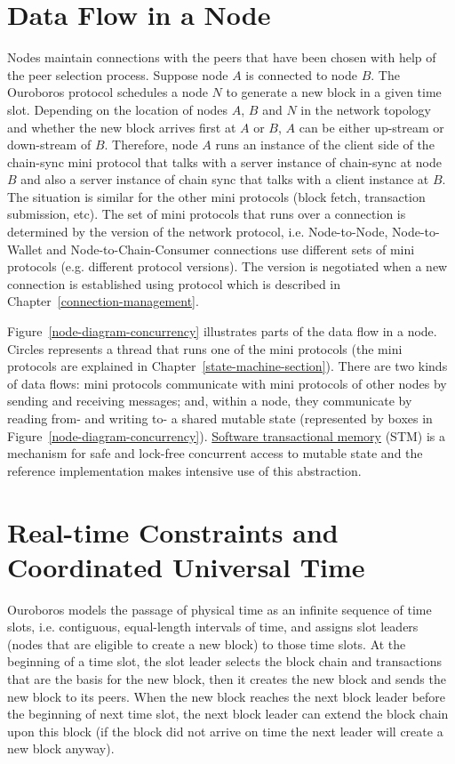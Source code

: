 \documentclass{report}
\newcommand{\hide}[1]{}
\newcommand{\hide}[1]{}
\theoremstyle{definition}{
  \newtheorem{lemma}{Lemma}[section] %
  \newtheorem{definition}[lemma]{Definition}
}
\theoremstyle{theorem}{
  \newtheorem{invariant}[lemma]{Invariant}
  \newtheorem{proofobligation}[lemma]{Proof Obligation}
}
\numberwithin{equation}{lemma}
\begin{document}
\section{Data Flow in a Node}
Nodes maintain connections with the peers that have been chosen
with help of the peer selection process.
Suppose node $A$ is connected to node $B$.
The Ouroboros protocol schedules a node $N$ to generate a new block in a given time slot.
Depending on the location of nodes $A$, $B$ and $N$ in the network topology and whether the new
block arrives first at $A$ or $B$, $A$ can be either up-stream or down-stream of $B$.
Therefore, node $A$ runs an instance of the client side of the chain-sync mini protocol
that talks with a server instance of chain-sync at node $B$ and also a server instance of chain sync
that talks with a client instance at $B$.
The situation is similar for the other mini protocols (block fetch, transaction submission, etc).
The set of mini protocols that runs over a connection is determined by the version of the network
protocol, i.e.  Node-to-Node, Node-to-Wallet and Node-to-Chain-Consumer
connections use different sets of mini protocols (e.g. different protocol
versions).  The version is negotiated when a new connection is established
using protocol which is described in Chapter~\ref{connection-management}.
\hide{Add description of this protocol in Chapter~\ref{connection-management}
and link it.}

Figure~\ref{node-diagram-concurrency} illustrates parts of the data flow in a node.
Circles represents a thread that runs one of the mini protocols (the mini protocols are explained in
Chapter~\ref{state-machine-section}).
There are two kinds of data flows:
mini protocols communicate with mini protocols of other nodes by sending and receiving messages;
and, within a node, they communicate by reading from- and writing to- a shared
mutable state (represented by boxes in Figure~\ref{node-diagram-concurrency}).
\href{https://en.wikipedia.org/wiki/Software_transactional_memory}{Software transactional memory}
(STM) is a mechanism for safe and lock-free concurrent
access to mutable state and the reference implementation makes intensive use of this abstraction.

\section{Real-time Constraints and Coordinated Universal Time}
Ouroboros models the passage of physical time as an infinite sequence of time slots,
i.e. contiguous, equal-length intervals of time,
and assigns slot leaders (nodes that are eligible to create a new block) to those time slots.
At the beginning of a time slot, the slot leader selects the block chain and transactions that are the basis
for the new block, then it creates the new block and sends the new block to its peers.
When the new block reaches the next block leader before the beginning of next time slot,
the next block leader can extend the block chain upon this block (if the block
did not arrive on time the next leader will create a new block anyway).
\end{document}
